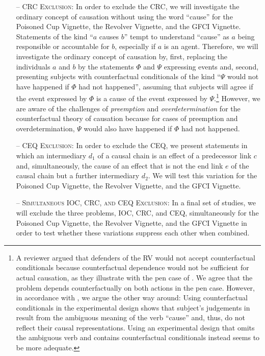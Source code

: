\documentclass[egregdoesnotlikesansseriftitles,12pt]{scrartcl}
\begin{document}
\begin{itemize}
   \item[--]\textsc{CRC Exclusion:} In order to exclude the CRC, we will investigate the ordinary concept of causation without using the word ``cause'' for the Poisoned Cup Vignette, the Revolver Vignette, and the GFCI Vignette. Statements of the kind ``$a$ causes $b$'' tempt to understand ``cause'' as $a$ being responsible or accountable for $b$, especially if $a$ is an agent. Therefore, we will investigate the ordinary concept of causation by, first, replacing the individuals $a$ and $b$ by the statements $\Phi$ and $\Psi$ expressing events and, second, presenting subjects with counterfactual conditionals of the kind ``$\Psi$ would not have happened if $\Phi$ had not happened'', assuming that subjects will agree if the event expressed by $\Phi$ is a cause of the event expressed by $\Psi$.\footnote{A reviewer argued that defenders of the RV would not accept counterfactual conditionals because counterfactual dependence would not be sufficient for actual causation, as they illustrate with the pen case of \citet{knobe_causal_2008}. We agree that the problem depends counterfactually on both actions in the pen case. However, in accordance with \citet{samland_social_2014}, we argue the other way around: Using counterfactual conditionals in the experimental design shows that subject's judgements in \citet{knobe_causal_2008} result from the ambiguous meaning of the verb ``cause'' and, thus, do not reflect their causal representations. Using an experimental design that omits the ambiguous verb and contains counterfactual conditionals instead seems to be more adequate.} However, we are aware of the challenges of \textit{preemption} and \textit{overdetermination} for the counterfactual theory of causation because for cases of preemption and overdetermination, $\Psi$ would also have happened if $\Phi$ had not happened.
   \item[--]\textsc{CEQ Exclusion:} In order to exclude the CEQ, we present statements in which an intermediary $d_{1}$ of a causal chain is an effect of a predecessor link $c$ and, simultaneously, the cause of an effect that is not the end link $e$ of the causal chain but a further intermediary $d_{2}$. We will test this variation for the Poisoned Cup Vignette, the Revolver Vignette, and the GFCI Vignette.
   \item[--]\textsc{Simultaneous IOC, CRC, and CEQ Exclusion}: In a final set of studies, we will exclude the three problems, IOC, CRC, and CEQ, simultaneously for the Poisoned Cup Vignette, the Revolver Vignette, and the GFCI Vignette in order to test whether these variations suppress each other when combined.
\end{itemize}
\end{document}
